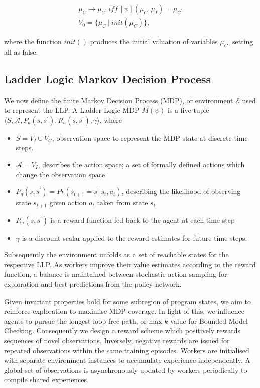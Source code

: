 \documentclass[conference,compsoc]{IEEEtran}
\begin{document}
\begin{align}
	\mu_C \to \mu_{C^\prime} \ \textit{iff} \ [\psi](\mu_C,\mu_I)=\mu_{C^\prime} \\
	V_0 = \{\mu_C \ | \ init(\mu_C)\},
\end{align}

where the function $init()$ produces the initial valuation of variables $\mu_C$, setting all as false.\\

\subsection{Ladder Logic Markov Decision Process}\label{subsect:MDP}
We now define the finite Markov Decision Process (MDP), or environment $\mathcal{E}$ used to represent the LLP. A Ladder Logic MDP $M(\psi)$ is a five tuple $\langle S,\mathcal{A},P_a(s,s^\prime), R_a(s,s^\prime),\gamma \rangle$, where 
\begin{itemize}
	\item $S = V_I \cup V_C$, observation space to represent the MDP state at discrete time steps.
	\item $\mathcal{A} = V_I$, describes the action space; a set of formally defined actions which change the observation space
	\item $P_a(s,s^\prime) = Pr(s_{t+1} = s^\prime | s_t, a_t)$, describing the likelihood of observing state $s_{t+1}$ given action $a_t$ taken from state $s_t$
	\item $R_a(s,s^\prime)$ is a reward function fed back to the agent at each time step
	\item $\gamma$ is a discount scalar applied to the reward estimates for future time steps.
\end{itemize}

Subsequently the environment unfolds as a set of reachable states for the respective LLP. As workers improve their value estimates according to the reward function, a balance is maintained between stochastic action sampling for exploration and best predictions from the policy network.

Given invariant properties hold for some subregion of program states, we aim to reinforce exploration to maximise MDP coverage. In light of this, we influence agents to pursue the longest loop free path, or max $k$ value for Bounded Model Checking. Consequently we design a reward scheme which positively rewards sequences of novel observations. Inversely, negative rewards are issued for repeated observations within the same training episodes. Workers are initialised with separate environment instances to accumulate experience independently. A global set of observations is asynchronously updated by workers periodically to compile shared experiences.    
\end{document}
